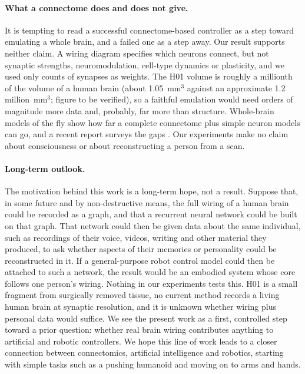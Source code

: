 \documentclass[11pt]{article}
\begin{document}
\paragraph{What a connectome does and does not give.} It is tempting to read a successful connectome-based controller as a step toward emulating a whole brain, and a failed one as a step away. Our result supports neither claim. A wiring diagram specifies which neurons connect, but not synaptic strengths, neuromodulation, cell-type dynamics or plasticity, and we used only counts of synapses as weights. The H01 volume is roughly a millionth of the volume of a human brain (about 1.05~mm$^3$ against an approximate 1.2 million~mm$^3$; figure to be verified), so a faithful emulation would need orders of magnitude more data and, probably, far more than structure. Whole-brain models of the fly \citep{shiu2024fly} show how far a complete connectome plus simple neuron models can go, and a recent report surveys the gaps \citep{brainemulation2025}. Our experiments make no claim about consciousness or about reconstructing a person from a scan.

\paragraph{Long-term outlook.} The motivation behind this work is a long-term hope, not a result. Suppose that, in some future and by non-destructive means, the full wiring of a human brain could be recorded as a graph, and that a recurrent neural network could be built on that graph. That network could then be given data about the same individual, such as recordings of their voice, videos, writing and other material they produced, to ask whether aspects of their memories or personality could be reconstructed in it. If a general-purpose robot control model could then be attached to such a network, the result would be an embodied system whose core follows one person's wiring. Nothing in our experiments tests this. H01 is a small fragment from surgically removed tissue, no current method records a living human brain at synaptic resolution, and it is unknown whether wiring plus personal data would suffice. We see the present work as a first, controlled step toward a prior question: whether real brain wiring contributes anything to artificial and robotic controllers. We hope this line of work leads to a closer connection between connectomics, artificial intelligence and robotics, starting with simple tasks such as a pushing humanoid and moving on to arms and hands.
\end{document}
